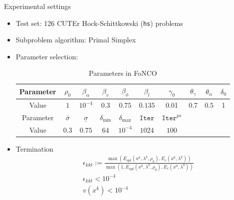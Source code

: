 \documentclass[8pt]{beamer}
\begin{document}
	\begin{frame}{Experimental settings}
		\begin{itemize}
			\item Test set:  126 CUTEr Hock-Schittkowski (\texttt{hs}) problems
		\vfill
			\item Subproblem algorithm: Primal Simplex
		\vfill
			\item Parameter selection:   
				\begin{table}[H]
				\centering
				\caption{Parameters in FoNCO}
				\label{tab.para}
				\begin{tabular}{c|ccccccccc}\hline
					Parameter  & $\rho_0$   &  $\beta_\alpha$  &  $\beta_v$& $\beta_\phi$ & $\beta_l$                  &  $\gamma_0$  &  $\theta_\gamma$   & $\theta_\alpha$    & $\delta_0$    \\ \hline 
					Value   &   $1$    &  $10^{-4}     $  &  $0.3    $& $0.75$       & $0.135$ &     0.01     &  0.7   &   $0.5$  & 1  \\  \hline\hline

				Parameter &      $\bar\sigma$     &  $\underline{\sigma}$  &  $\delta_{\min} $  &    $\delta_{\max}$      & $\texttt{Iter}$ & $\texttt{Iter}^{ps}$  &  & & \\  \hline
					Value &           $0.3$  &   $0.75$  &  $64$       &   $10^{-4}$  &        $1024$   &  $100$ & & & \\  \hline
				\end{tabular}\end{table}
		\vfill
			\item Termination 
				\begin{equation}\label{relative.kkt}\begin{aligned}
					& \epsilon_{kkt} := \frac{\max(E_{opt}(x^k, \lambda^k, \rho_k), E_c(x^k, \lambda^k))}{\max(1, E_{opt}(x^0, \lambda^0, \rho_0), E_c(x^0, \lambda^0))}\\
					& \epsilon_{kkt} < 10^{-4} \\
					& v(x^k) < 10^{-4}
				\end{aligned}\end{equation}
		\end{itemize}
	\end{frame}
\end{document}
